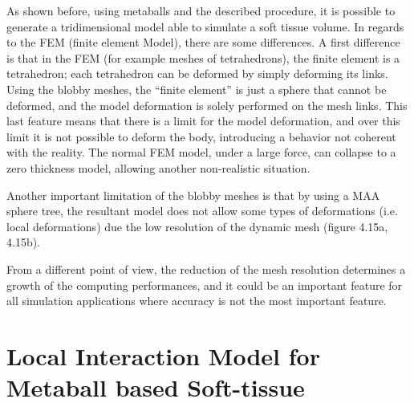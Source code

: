\documentclass[journal]{vgtc}                %
\begin{document}
As shown before, using metaballs and the described procedure, it is possible to
generate a tridimensional model able to simulate a soft tissue volume. In regards to
the FEM (finite element Model), there are some differences. A first difference is that
in the FEM (for example meshes of tetrahedrons), the finite element is a tetrahedron;
each tetrahedron can be deformed by simply deforming its links. Using the blobby
meshes, the “finite element” is just a sphere that cannot be deformed, and the model
deformation is solely performed on the mesh links. This last feature means that there
is a limit for the model deformation, and over this limit it is not possible to deform
the body, introducing a behavior not coherent with the reality. The normal FEM
model, under a large force, can collapse to a zero thickness model, allowing another
non-realistic situation.

Another important limitation of the blobby meshes is that by using a MAA sphere
tree, the resultant model does not allow some types of deformations (i.e. local
deformations) due the low resolution of the dynamic mesh (figure 4.15a, 4.15b).

From a different point of view, the reduction of the mesh resolution determines a
growth of the computing performances, and it could be an important feature for all
simulation applications where accuracy is not the most important feature.

\section{Local Interaction Model for Metaball based Soft-tissue}
\end{document}
